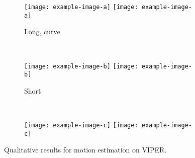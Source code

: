 		\begin{figure}
			\centering
			\begin{subfigure}[b]{\linewidth}
				\centering
				\texttt{[image: example-image-a]}
				\texttt{[image: example-image-a]}
				\caption{
					Long, curve
					\label{fig:0}
				}
			\end{subfigure}%
			\\
			\begin{subfigure}[b]{\linewidth}
				\centering
				\texttt{[image: example-image-b]}
				\texttt{[image: example-image-b]}
				\caption{
					Short
					\label{fig:0}
				}
			\end{subfigure}%
			\\
			\begin{subfigure}[b]{\linewidth}
				\centering
				\texttt{[image: example-image-c]}
				\texttt{[image: example-image-c]}
				\caption{
					\label{fig:0}
				}
			\end{subfigure}%
			\caption[Qualitative results for motion estimation on VIPER]
					{Qualitative results for motion estimation on VIPER.
				 \label{fig:0}}
		\end{figure}